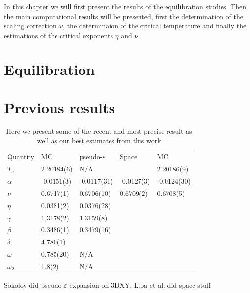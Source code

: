 %
In this chapter we will first present the results of the equilibration studies. Then the main computational results will be presented, first the determination of the scaling correction $\omega$, the determinaion of the critical temperature and finally the estimations of the critical exponents $\eta$ and $\nu$.
\section{Equilibration}

\section{Previous results}
\begin{table}[!htpb]
\begin{center}
\begin{tabular}{l l l l l}
  Quantity 	& MC\cite{Campostrini2006} 	& pseudo-$\varepsilon$\cite{Sokolov2016} & Space\cite{Lipa2003}	& MC\cite{Jeon2012} \\
  $T_c$		& 2.20184(6)			& N/A					&			& 2.20186(9)\\
  $\alpha $	& -0.0151(3)			& -0.0117(31)				&-0.0127(3)		& -0.0124(30)\\
  $\nu	  $     & 0.6717(1) 			& 0.6706(10)				&0.6709(2)		& 0.6708(5)\\
  $\eta   $     & 0.0381(2) 			& 0.0376(28) 				&			& \\
  $\gamma $	& 1.3178(2) 			& 1.3159(8)				&			& \\
  $\beta  $     & 0.3486(1) 			& 0.3479(16)				&			& \\
  $\delta $	& 4.780(1) 			& 					&			& \\
  $\omega $     & 0.785(20) 			& N/A					&			& \\
  $\omega_2$ 	& 1.8(2) 			& N/A					&			& \\
\end{tabular}
\end{center}
\caption{Here we present some of the recent and most precise result as well as our best estimates from this work }
\end{table}
Sokolov did pseudo-$\varepsilon$ expansion on 3DXY.\cite{Sokolov2016}
Lipa et al. did space stuff \cite{Lipa2003}
